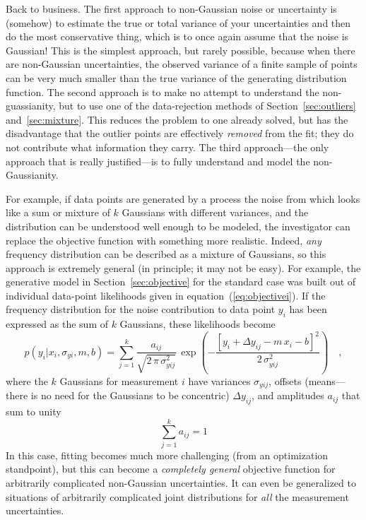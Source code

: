 \documentclass[12pt,twoside]{article}
\newcommand{\sectionname}{Section}
\newcommand{\equationname}{equation}
\newcounter{problem}
\begin{document}
Back to business.  The first approach to non-Gaussian noise or
uncertainty is (somehow) to estimate the true or total variance of
your uncertainties and then do the most conservative thing, which is
to once again assume that the noise is Gaussian!  This is the simplest
approach, but rarely possible, because when there are non-Gaussian
uncertainties, the observed variance of a finite sample of points can
be very much smaller than the true variance of the generating
distribution function.  The second approach is to make no attempt to
understand the non-guassianity, but to use one of the data-rejection
methods of \sectionname~\ref{sec:outliers} and~\ref{sec:mixture}.
This reduces the problem to one already solved, but has the
disadvantage that the outlier points are effectively \emph{removed}
from the fit; they do not contribute what information they carry.  The
third approach---the only approach that is really justified---is to
fully understand and model the non-Gaussianity.

For example, if data points are generated by a process the noise from
which looks like a sum or mixture of $k$ Gaussians with different
variances, and the distribution can be understood well enough to be
modeled, the investigator can replace the objective function with
something more realistic.  Indeed, \emph{any} frequency distribution
can be described as a mixture of Gaussians, so this approach is
extremely general (in principle; it may not be easy).  For example,
the generative model in \sectionname~\ref{sec:objective} for the
standard case was built out of individual data-point likelihoods given
in \equationname~(\ref{eq:objectivei}).  If the frequency distribution
for the noise contribution to data point $y_i$ has been expressed as
the sum of $k$ Gaussians, these likelihoods become
\begin{equation}
p(y_i|x_i,\sigma_{yi},m,b) = \sum_{j=1}^k
 \frac{a_{ij}}{\sqrt{2\,\pi\,\sigma_{yij}^2}}
 \,\exp\left(-\frac{[y_i+\Delta y_{ij}-m\,x_i-b]^2}{2\,\sigma_{yij}^2}\right)
 \quad ,
\end{equation}
where the $k$ Gaussians for measurement $i$ have variances
$\sigma_{yij}$, offsets (means---there is no need for the Gaussians to
be concentric) $\Delta y_{ij}$, and amplitudes $a_{ij}$ that sum to
unity
\begin{equation}
\sum_{j=1}^k a_{ij} = 1
\end{equation}
In this case, fitting becomes much more challenging (from an
optimization standpoint), but this can become a \emph{completely
  general} objective function for arbitrarily complicated non-Gaussian
uncertainties.  It can even be generalized to situations of
arbitrarily complicated joint distributions for \emph{all} the
measurement uncertainties.
\end{document}
